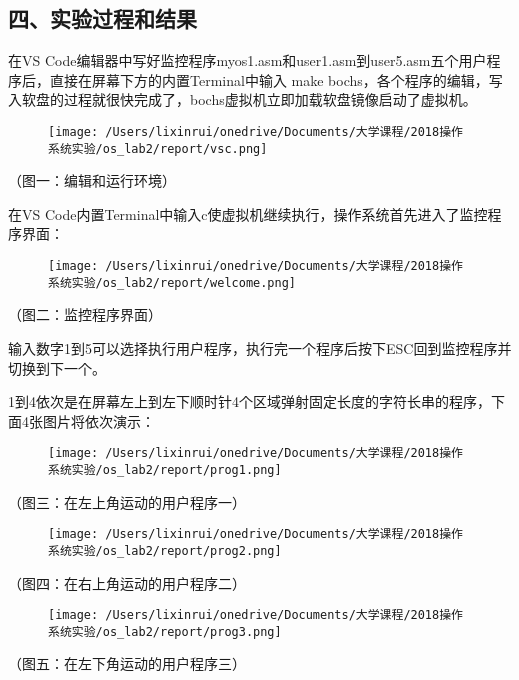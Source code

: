 \documentclass[ctexart]{article}
\begin{document}
\hypertarget{header-n152}{%
\subsection{四、实验过程和结果}\label{header-n152}}

在VS
Code编辑器中写好监控程序myos1.asm和user1.asm到user5.asm五个用户程序后，直接在屏幕下方的内置Terminal中输入
make
bochs，各个程序的编辑，写入软盘的过程就很快完成了，bochs虚拟机立即加载软盘镜像启动了虚拟机。

\begin{figure}
\centering
\texttt{[image: /Users/lixinrui/onedrive/Documents/大学课程/2018操作系统实验/os\_lab2/report/vsc.png]}
\caption{}
\end{figure}

（图一：编辑和运行环境）

在VS
Code内置Terminal中输入c使虚拟机继续执行，操作系统首先进入了监控程序界面：

\begin{figure}
\centering
\texttt{[image: /Users/lixinrui/onedrive/Documents/大学课程/2018操作系统实验/os\_lab2/report/welcome.png]}
\caption{}
\end{figure}

（图二：监控程序界面）

输入数字1到5可以选择执行用户程序，执行完一个程序后按下ESC回到监控程序并切换到下一个。

1到4依次是在屏幕左上到左下顺时针4个区域弹射固定长度的字符长串的程序，下面4张图片将依次演示：

\begin{figure}
\centering
\texttt{[image: /Users/lixinrui/onedrive/Documents/大学课程/2018操作系统实验/os\_lab2/report/prog1.png]}
\caption{}
\end{figure}

（图三：在左上角运动的用户程序一）

\begin{figure}
\centering
\texttt{[image: /Users/lixinrui/onedrive/Documents/大学课程/2018操作系统实验/os\_lab2/report/prog2.png]}
\caption{}
\end{figure}

（图四：在右上角运动的用户程序二）

\begin{figure}
\centering
\texttt{[image: /Users/lixinrui/onedrive/Documents/大学课程/2018操作系统实验/os\_lab2/report/prog3.png]}
\caption{}
\end{figure}

（图五：在左下角运动的用户程序三）
\end{document}
